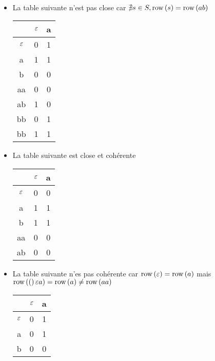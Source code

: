 \begin{exemple} \label{ex:tables}
	\ \newline
	\begin{itemize}
		\item La table suivante n'est pas close car $\nexists s \in S, \text{row}\left(s\right) = \text{row}\left(ab\right)$
		      \begin{center}
			      \begin{tabular}{c|c|c}
				                 & $\varepsilon$ & a \\ \hline
				      $\varepsilon$ & 0          & 1 \\
				      a          & 1          & 1 \\
				      b          & 0          & 0 \\ \hline

				      aa         & 0          & 0 \\
				      ab         & 1          & 0 \\
				      bb         & 0          & 1 \\
				      bb         & 1          & 1 \\
			      \end{tabular}
		      \end{center}

		\item La table suivante est close et cohérente
		      \begin{center}
			      \begin{tabular}{c|c|c}
				                 & $\varepsilon$ & a \\ \hline
				      $\varepsilon$ & 0          & 0 \\
				      a          & 1          & 1 \\ \hline

				      b          & 1          & 1 \\
				      aa         & 0          & 0 \\
				      ab         & 0          & 0 \\
			      \end{tabular}
		      \end{center}
		\item La table suivante n'es pas cohérente car $\text{row}\left(\varepsilon\right) = \text{row}\left(a\right)$ mais
		      $\text{row}\left((\right)\varepsilon a) = \text{row}\left(a\right) \neq \text{row}\left(aa\right)$

		      \begin{center}
			      \begin{tabular}{c|c|c}
				                 & $\varepsilon$ & a \\ \hline
				      $\varepsilon$ & 0          & 1 \\
				      a          & 0          & 1 \\
				      b          & 0          & 0 \\ \hline


\end{tabular}
\end{center}
\end{itemize}
\end{exemple}
